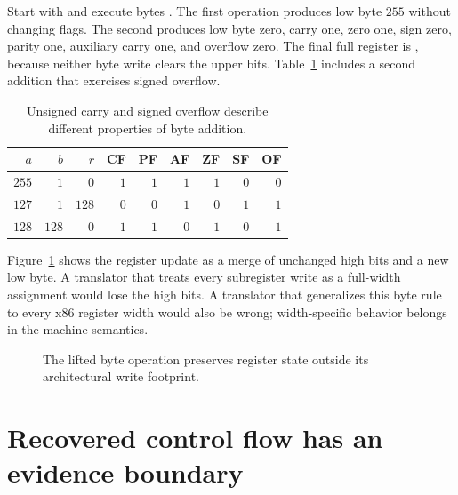 Start with  and execute bytes .
The first operation produces low byte $255$ without changing flags.
The second produces low byte zero, carry one, zero one, sign zero, parity one, auxiliary carry one, and overflow zero.
The final full register is , because neither byte write clears the upper bits.
Table~\ref{tab:ch64-flags} includes a second addition that exercises signed overflow.

\begin{table}[htbp]
\caption{Unsigned carry and signed overflow describe different properties of byte addition.}
\label{tab:ch64-flags}
\centering
\begin{tabular}{rrrrrrrrr}
\toprule
$a$ & $b$ & $r$ & CF & PF & AF & ZF & SF & OF \\
\midrule
$255$ & $1$ & $0$ & $1$ & $1$ & $1$ & $1$ & $0$ & $0$ \\
$127$ & $1$ & $128$ & $0$ & $0$ & $1$ & $0$ & $1$ & $1$ \\
$128$ & $128$ & $0$ & $1$ & $1$ & $0$ & $1$ & $0$ & $1$ \\
\bottomrule
\end{tabular}
\end{table}

Figure~\ref{fig:ch64-register} shows the register update as a merge of unchanged high bits and a new low byte.
A translator that treats every subregister write as a full-width assignment would lose the high bits.
A translator that generalizes this byte rule to every x86 register width would also be wrong; width-specific behavior belongs in the machine semantics.

\begin{figure}[htbp]
\centering
{}
\caption{The lifted byte operation preserves register state outside its architectural write footprint.}
\label{fig:ch64-register}
\end{figure}

\section{Recovered control flow has an evidence boundary}
\label{sec:ch64-cfg}

